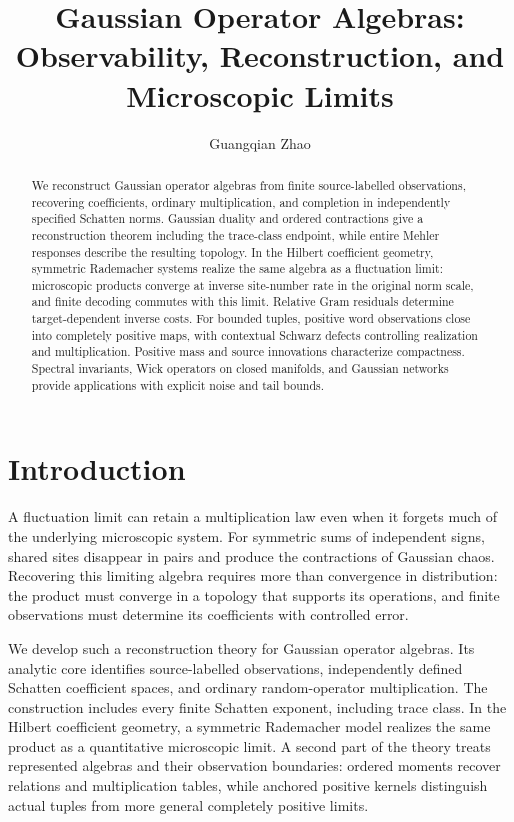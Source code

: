 \documentclass[11pt,a4paper]{amsart}
\title[Gaussian operator algebras]{Gaussian Operator Algebras:\\
Observability, Reconstruction, and Microscopic Limits}
\author{Guangqian Zhao}
\date{}
\numberwithin{equation}{section}
\theoremstyle{definition}
\theoremstyle{remark}
\begin{document}
\begin{abstract}
We reconstruct Gaussian operator algebras from finite source-labelled observations, recovering coefficients, ordinary multiplication, and completion in independently specified Schatten norms. Gaussian duality and ordered contractions give a reconstruction theorem including the trace-class endpoint, while entire Mehler responses describe the resulting topology. In the Hilbert coefficient geometry, symmetric Rademacher systems realize the same algebra as a fluctuation limit: microscopic products converge at inverse site-number rate in the original norm scale, and finite decoding commutes with this limit. Relative Gram residuals determine target-dependent inverse costs. For bounded tuples, positive word observations close into completely positive maps, with contextual Schwarz defects controlling realization and multiplication. Positive mass and source innovations characterize compactness. Spectral invariants, Wick operators on closed manifolds, and Gaussian networks provide applications with explicit noise and tail bounds.
\end{abstract}
\maketitle
\pagestyle{plain}
\raggedbottom

\section{Introduction}\label{sec:intro}
A fluctuation limit can retain a multiplication law even when it forgets much of the underlying microscopic system. For symmetric sums of independent signs, shared sites disappear in pairs and produce the contractions of Gaussian chaos. Recovering this limiting algebra requires more than convergence in distribution: the product must converge in a topology that supports its operations, and finite observations must determine its coefficients with controlled error.

We develop such a reconstruction theory for Gaussian operator algebras. Its analytic core identifies source-labelled observations, independently defined Schatten coefficient spaces, and ordinary random-operator multiplication. The construction includes every finite Schatten exponent, including trace class. In the Hilbert coefficient geometry, a symmetric Rademacher model realizes the same product as a quantitative microscopic limit. A second part of the theory treats represented algebras and their observation boundaries: ordered moments recover relations and multiplication tables, while anchored positive kernels distinguish actual tuples from more general completely positive limits.
\end{document}
